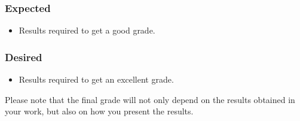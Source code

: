 \documentclass[master]{thesis_proposal}
\begin{document}
\subsubsection*{Expected}
\begin{itemize}
    \item Results required to get a good grade.
\end{itemize}

\subsubsection*{Desired}
\begin{itemize}
    \item Results required to get an excellent grade.
\end{itemize}

Please note that the final grade will not only depend on the results obtained in your work, but also on how you present the results.

\printbibliography
\end{document}
